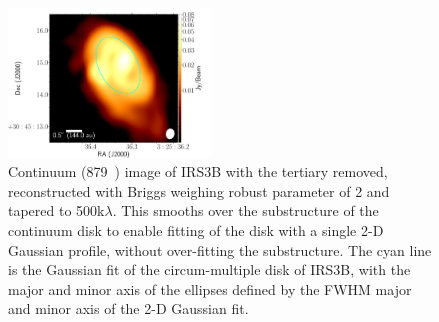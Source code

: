 \begin{figure}[H]
  \begin{center}
   \includegraphics[width=0.48\textwidth]{img/L1448IRS3B-cont-subclump-robust2-uvtaper500taper500-remtert.pdf} %
   \end{center}
   \caption{Continuum (879~\micron) image of IRS3B with the tertiary removed, reconstructed with Briggs weighing robust parameter of 2 and tapered to 500k$\lambda$. This smooths over the substructure of the continuum disk to enable fitting of the disk with a single 2-D Gaussian profile, without over-fitting the substructure. The cyan line is the Gaussian fit of the circum-multiple disk of IRS3B, with the major and minor axis of the ellipses defined by the FWHM major and minor axis of the 2-D Gaussian fit.} \label{fig:subclumptaper}
\end{figure}